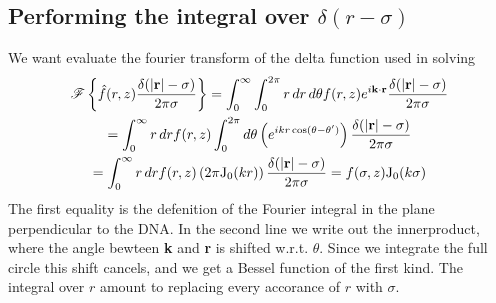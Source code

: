 \subsection{ Performing the integral over $\delta(r-\sigma)$}
We want evaluate the fourier transform of the delta function used in solving 
\begin{multline}
 \mathscr{F}\left\lbrace \hat{f}(r,z) \frac{\delta(|\mathbf r \mathrm| - \sigma)}{2 \pi \sigma} \right\rbrace 
 = \int_0^{\infty} \int_0^{2 \pi} r\,dr \, d\theta f(r,z) e^{i {\bf k \cdot r}} \frac{\delta(|\mathbf r \mathrm| - \sigma)}{2 \pi \sigma} \\
 = \int_0^{\infty} r\,dr f(r,z) \int_0^{2 \pi} d\theta \left( e^{i k r \, {\rm cos}(\theta - \theta')} \right) \frac{\delta(|\mathbf r \mathrm| - \sigma)}{2 \pi \sigma} \\
 = \int_0^{\infty} r\,dr f(r,z) \left( 2 \pi {\rm J_0}(k r) \right) \frac{\delta(|\mathbf r \mathrm| - \sigma)}{2 \pi \sigma} 
 = f(\sigma, z) {\rm J_0}(k \sigma)
\end{multline}
The first equality is the defenition of the Fourier integral in the plane perpendicular to the DNA. In the second line we write out the innerproduct, where the angle bewteen {\bf k} and {\bf r} is shifted w.r.t. $\theta$. Since we integrate the full circle this shift cancels, and we get a Bessel function of the first kind. The integral over $r$ amount to replacing every accorance of $r$ with $\sigma$.